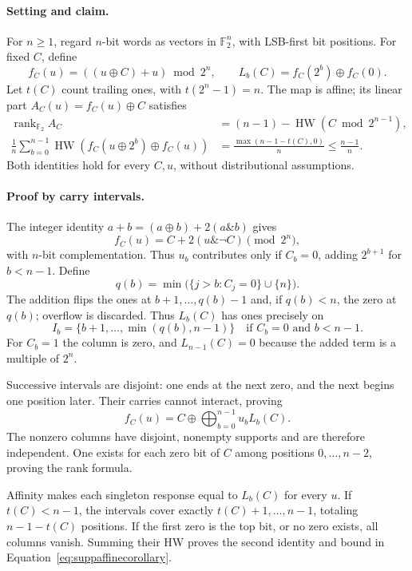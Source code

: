 \paragraph{Setting and claim.}

For $n\geq1$, regard $n$-bit words as vectors in $\mathbb F_2^n$, with LSB-first bit positions. For fixed $C$, define
\[
 f_C(u)=((u\oplus C)+u)\bmod2^n,\qquad
 L_b(C)=f_C(2^b)\oplus f_C(0).
\]
Let $t(C)$ count trailing ones, with $t(2^n-1)=n$. The map is affine; its linear part $A_C(u)=f_C(u)\oplus C$ satisfies
\begin{equation}
\begin{aligned}
 \operatorname{rank}_{\mathbb F_2} A_C
   &=(n-1)-\operatorname{HW}(C\bmod2^{n-1}),\\
 \frac1n\sum_{b=0}^{n-1}\operatorname{HW}\!\left(f_C(u\oplus2^b)\oplus f_C(u)\right)
   &=\frac{\max(n-1-t(C),0)}{n}\leq\frac{n-1}{n}.
\end{aligned}
\label{eq:suppaffinecorollary}
\end{equation}
Both identities hold for every $C,u$, without distributional assumptions.

\paragraph{Proof by carry intervals.}

The integer identity $a+b=(a\oplus b)+2(a\mathbin{\&}b)$ gives
\[
 f_C(u)=C+2(u\mathbin{\&}\neg C)\pmod{2^n},
\]
with $n$-bit complementation. Thus $u_b$ contributes only if $C_b=0$, adding $2^{b+1}$ for $b<n-1$. Define
\[
 q(b)=\min\bigl(\{j>b:C_j=0\}\cup\{n\}\bigr).
\]
The addition flips the ones at $b+1,\ldots,q(b)-1$ and, if $q(b)<n$, the zero at $q(b)$; overflow is discarded. Thus $L_b(C)$ has ones precisely on
\[
 I_b=\{b+1,\ldots,\min(q(b),n-1)\}
 \quad\text{if }C_b=0\text{ and }b<n-1.
\]
For $C_b=1$ the column is zero, and $L_{n-1}(C)=0$ because the added term is a multiple of $2^n$.

Successive intervals are disjoint: one ends at the next zero, and the next begins one position later. Their carries cannot interact, proving
\[
 f_C(u)=C\oplus\bigoplus_{b=0}^{n-1}u_bL_b(C).
\]
The nonzero columns have disjoint, nonempty supports and are therefore independent. One exists for each zero bit of $C$ among positions $0,\ldots,n-2$, proving the rank formula.

Affinity makes each singleton response equal to $L_b(C)$ for every $u$. If $t(C)<n-1$, the intervals cover exactly $t(C)+1,\ldots,n-1$, totaling $n-1-t(C)$ positions. If the first zero is the top bit, or no zero exists, all columns vanish. Summing their HW proves the second identity and bound in Equation~\eqref{eq:suppaffinecorollary}.

